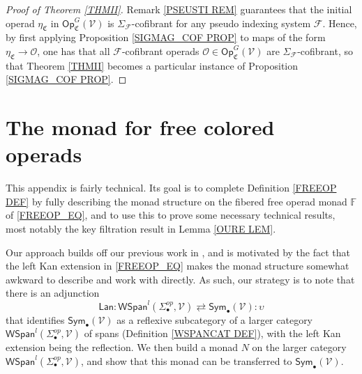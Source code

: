 \documentclass[a4paper,10pt
]{article}%
\numberwithin{equation}{section}
\numberwithin{figure}{section}
\theoremstyle{definition} %
\newcommand{\F}{\ensuremath{\mathcal F}}
\newcommand{\V}{\ensuremath{\mathcal V}}
\renewcommand{\O}{\ensuremath{\mathcal O}}
\newcommand{\1}{\ensuremath{\mathbbm 1}}%
\begin{document}
\begin{proof}[Proof of Theorem \ref{THMII}]
	Remark \ref{PSEUSTI REM}
	guarantees that the initial operad 
	$\eta_{\mathfrak{C}}$
	in $\mathsf{Op}^G_{\mathfrak{C}}(\V)$
	is $\Sigma_{\F}$-cofibrant for any
	pseudo indexing system $\F$.
	Hence, by first applying Proposition \ref{SIGMAG_COF PROP}
	to maps of the form $\eta_{\mathfrak{C}} \to \O$,
	one has that all $\F$-cofibrant operads
	$\O \in \mathsf{Op}^G_{\mathfrak{C}}(\V)$
	are $\Sigma_{\F}$-cofibrant,
	so that Theorem \ref{THMII} becomes a particular instance of 
	Proposition \ref{SIGMAG_COF PROP}.
\end{proof}








\appendix


\section{The monad for free colored operads}
\label{MONAD_APDX}

This appendix is fairly technical.
Its goal is to complete Definition \ref{FREEOP DEF}
by fully describing the monad structure 
on the fibered free operad monad $\mathbb{F}$
of \eqref{FREEOP_EQ},
and to use this to prove some necessary technical results,
most notably the key filtration result in Lemma \ref{OURE LEM}.


Our approach builds off our previous work in \cite{BP21},
and is motivated by the fact that the left Kan extension in \eqref{FREEOP_EQ} makes the monad structure somewhat awkward to describe and work with directly.
As such, our strategy is to note that there is an adjunction 
\begin{equation}\label{SPANSYMADJ EQ}
\mathsf{Lan} \colon
\mathsf{WSpan}^l(\Sigma_{\bullet}^{op},\mathcal{V}) 
\rightleftarrows
\mathsf{Sym}_{\bullet}(\mathcal{V})
\colon \upsilon
\end{equation}
that identifies $\mathsf{Sym}_{\bullet}(\V)$ 
as a reflexive subcategory of a larger category 
$\mathsf{WSpan}^l(\Sigma_{\bullet}^{op},\mathcal{V})$
of spans (Definition \ref{WSPANCAT DEF}),
with the left Kan extension being the reflection.
We then build a monad $N$ on the larger category 
$\mathsf{WSpan}^l(\Sigma_{\bullet}^{op},\mathcal{V})$,
and show that this monad can be transferred to 
$\mathsf{Sym}_{\bullet}(\mathcal{V})$.
\end{document}
